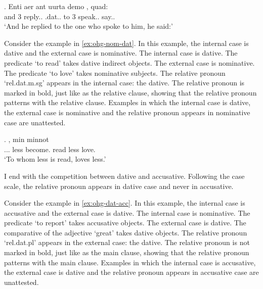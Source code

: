 \exg. Enti aer {ant uurta} demo  , quad:\\
and 3 reply..\scsub{[dat]} .\ac{dat}.. {to 3} speak..\scsub{[nom]} say..\\
`And he replied to the one who spoke to him, he said:' \label{ex:ohg-dat-nom}

Consider the example in \ref{ex:ohg-nom-dat}. In this example, the internal case is dative and the external case is nominative.
The internal case is dative. The predicate  `to read' takes dative indirect objects.
The external case is nominative. The predicate  `to love' takes nominative subjects.
The relative pronoun  `\ac{rel}.\ac{dat}.\ac{m}.\ac{sg}' appears in the internal case: the dative. The relative pronoun is marked in bold, just like as the relative clause, showing that the relative pronoun patterns with the relative clause.
Examples in which the internal case is dative, the external case is nominative and the relative pronoun appears in nominative case are unattested.

\exg.    , min minnot\\
... less become. read\scsub{[dat]} less love.\scsub{[nom]}\\
`To whom less is read, loves less.' \label{ex:ohg-nom-dat}

I end with the competition between dative and accusative. Following the case scale, the relative pronoun appears in dative case and never in accusative.

Consider the example in \ref{ex:ohg-dat-acc}. In this example, the internal case is accusative and the external case is dative.
The internal case is nominative. The predicate  `to report' takes accusative objects.
The external case is dative. The comparative of the adjective  `great' takes dative objects.
The relative pronoun  `\ac{rel}.\ac{dat}.\ac{pl}' appears in the external case: the dative. The relative pronoun is not marked in bold, just like as the main clause, showing that the relative pronoun patterns with the main clause.
Examples in which the internal case is accusative, the external case is dative and the relative pronoun appears in accusative case are unattested.

